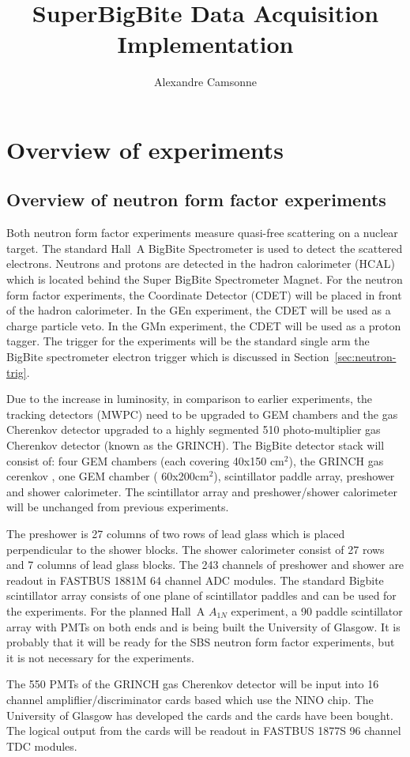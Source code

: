 \documentclass{article}
\title {SuperBigBite Data Acquisition Implementation}
\author{Alexandre Camsonne}
\begin{document}
\section{ Overview of experiments}
\subsection{Overview of neutron form factor experiments}
Both neutron form factor experiments measure quasi-free scattering on a nuclear target. The standard Hall~A
BigBite Spectrometer is used to detect the scattered electrons.  
Neutrons and protons are detected in
the hadron calorimeter (HCAL) which is located behind the Super BigBite Spectrometer Magnet. For the
neutron form factor experiments, the Coordinate Detector (CDET) will be placed in front of the hadron calorimeter.
In the GEn experiment, the CDET will be used as a charge particle veto. In the GMn experiment,
the CDET will be used as a proton tagger. The trigger for the experiments will be the standard single arm
the BigBite spectrometer electron trigger which is discussed in Section~\ref{sec:neutron-trig}.


Due to the increase in
luminosity, in comparison to earlier experiments, the tracking detectors (MWPC) need to be upgraded to
GEM chambers and the gas Cherenkov detector upgraded to a highly segmented 510 photo-multiplier gas
Cherenkov detector (known as the GRINCH).   The BigBite detector stack will consist of:
four GEM chambers (each covering 40x150 cm$^2$), the GRINCH gas cerenkov , one GEM chamber ( 60x200cm$^2$), 
scintillator paddle array, preshower and shower calorimeter. The scintillator array and preshower/shower
calorimeter will be unchanged from previous experiments. 

The preshower is 27 columns of two rows of lead glass which is placed perpendicular to the shower blocks.
The shower calorimeter consist of 27 rows and 7 columns of lead glass blocks. The 243 channels of
preshower and shower are readout in FASTBUS 1881M 64 channel ADC modules. The standard Bigbite 
scintillator array consists of one plane of scintillator paddles and can be used for the experiments. 
For the planned Hall~A $A_{1N}$ experiment, a 90  paddle scintillator array with
PMTs on both ends and is being built the University of Glasgow. It is probably that it will
be ready for the SBS neutron form factor experiments, but it is not necessary for the experiments.

The 550 PMTs of the GRINCH gas Cherenkov detector will be input into 16 channel ampliflier/discriminator
cards based which use the NINO chip. The University of Glasgow has developed the cards and the cards have 
been bought. The logical output from the cards will be readout in FASTBUS 1877S 96 channel TDC modules.
\end{document}
